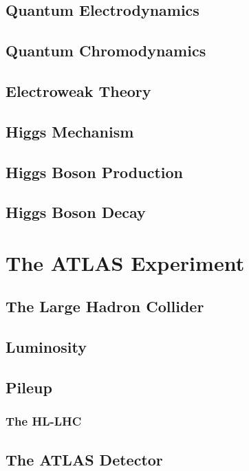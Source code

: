 \documentclass{umassthesis}          %
\begin{document}
\section{Quantum Electrodynamics}\label{sec:qed}
\section{Quantum Chromodynamics}\label{sec:qcd}
\section{Electroweak Theory}\label{sec:ew}
\section{Higgs Mechanism}\label{sec:higgs_mechanism}
\section{Higgs Boson Production}\label{sec:higgs_production}
\section{Higgs Boson Decay}\label{sec:higgs_decay}

\chapter{The ATLAS Experiment}\label{ch:atlas}
\section{The Large Hadron Collider}\label{sec:lhc}


\section{Luminosity}\label{sec:luminosity}


\section{Pileup}\label{sec:pileup}


\subsection{The HL-LHC}\label{sec:hl_lhc}


\section{The ATLAS Detector}\label{sec:atlas_detector}

\end{document}
